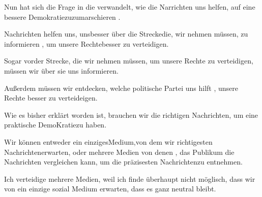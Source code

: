 \documentclass[a4paper]{article}
\begin{document}
        Nun hat sich die Frage in die verwandelt, wie die Narrichten uns helfen, auf eine bessere Demokratiezuzumarschieren .

        Nachrichten helfen uns, unsbesser über die Streckedie, wir nehmen müssen, zu informieren , um unsere Rechtebesser zu verteidigen.

        Sogar vorder Strecke, die wir nehmen müssen, um unsere Rechte zu verteidigen, müssen wir über sie uns informieren.

        Außerdem müssen wir entdecken, welche politische Partei uns hilft , unsere Rechte besser zu verteideigen.

        Wie es bisher erklärt worden ist, brauchen wir die richtigen Nachrichten, um eine praktische DemoKratiezu haben.

        Wir können entweder ein einzigesMedium,von dem wir richtigesten Nachrichtenerwarten, oder mehrere Medien von denen , das Publikum die Nachrichten vergleichen kann, um die präzisesten Nachrichtenzu entnehmen.

        Ich verteidige mehrere Medien, weil ich finde überhaupt nicht möglisch, dass wir von ein einzige sozial Medium erwarten, dass es ganz neutral bleibt.
\end{document}
